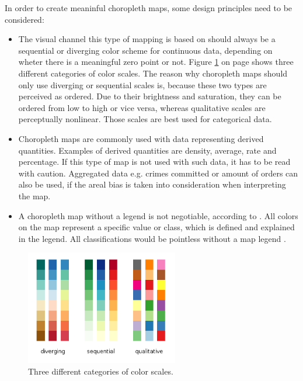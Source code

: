In order to create meaninful choropleth maps, some design principles need to be considered:

\begin{itemize}

\item The visual channel this type of mapping is based on should always be a sequential or diverging color scheme for continuous data, depending on wheter there is a meaningful zero point or not. Figure \ref{fig:colorbrewer} on page \pageref{fig:colorbrewer} shows three different categories of color scales. The reason why choropleth maps should only use diverging or sequential scales is, because these two types are perceived as ordered. Due to their brightness and saturation, they can be ordered from low to high or vice versa, whereas qualitative scales are perceptually nonlinear. Those scales are best used for categorical data.

\item Choropleth maps are commonly used with data representing derived quantities. Examples of derived quantities are density, average, rate and percentage. If this type of map is not used with such data, it has to be read with caution. Aggregated data e.g. crimes committed or amount of orders can also be used, if the areal bias is taken into consideration when interpreting the map.

\item A choropleth map without a legend is not negotiable, according to \citeauthor{Dent2008}. All colors on the map represent a specific value or class, which is defined and explained in the legend. All classifications would be pointless without a map legend .

\end{itemize}

\begin{figure}[!htb]
\centering
\includegraphics[height=5cm,keepaspectratio]{images/choropleth/color-scales.png}
\caption[
    Three different categories of color scales, Urldate: 07.2016 \newline
    \small\texttt{\url{http://www.gnuplotting.org/figs/colorbrewer.png}}
]{Three different categories of color scales.}
\label{fig:colorbrewer}
\end{figure}

